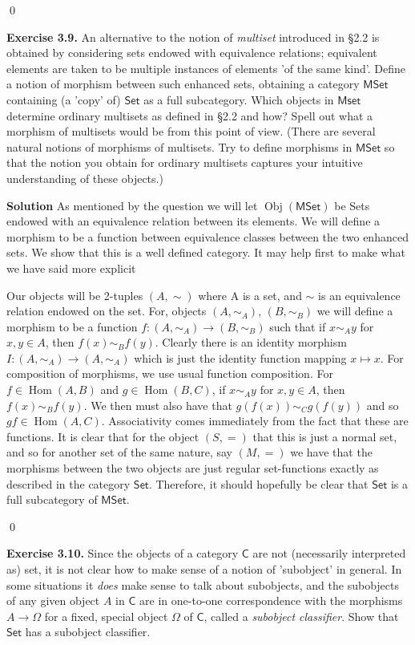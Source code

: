 \documentclass[titlepage]{article}
\newcommand{\Exercise}[1]{\textbf{Exercise #1}}
\newcommand{\Solution}{\textbf{Solution }}
\newcommand{\cat}[1]{\mathsf{#1}}
\newcommand{\Cat}{\cat{C}}
\DeclareMathOperator{\Hom}{Hom}
\DeclareMathOperator{\Obj}{Obj}
\begin{document}
\qed

\bigskip

\Exercise{3.9.} An alternative to the notion of \textit{multiset} introduced in \S 2.2 is obtained by considering sets endowed with equivalence relations; equivalent elements are taken to be multiple instances of elements 'of the same kind'. Define a notion of morphism between such enhanced sets, obtaining a category $\cat{MSet}$ containing (a 'copy' of) $\cat{Set}$ as a full subcategory. Which objects in $\cat{Mset}$ determine ordinary multisets as defined in \S 2.2 and how? Spell out what a morphism of multisets would be from this point of view. (There are several natural notions of morphisms of multisets. Try to define morphisms in $\cat{MSet}$ so that the notion you obtain for ordinary multisets captures your intuitive understanding of these objects.) 

\Solution As mentioned by the question we will let $\Obj(\cat{MSet})$ be Sets endowed with an equivalence relation between its elements. We will define a morphism to be a function between equivalence classes between the two enhanced sets. We show that this is a well defined category. It may help first to make what we have said more explicit

\smallskip

Our objects will be 2-tuples $(A,\sim)$ where A is a set, and $\sim$ is an equivalence relation endowed on the set. For, objects $(A,\sim_A)$, $(B,\sim_B)$ we will define a morphism to be a function $f:(A,\sim_A) \to (B,\sim_B)$ such that if $x \sim_A y$ for $x,y \in A$, then $f(x) \sim_B f(y)$. Clearly there is an identity morphism $I:(A,\sim_A) \to (A,\sim_A)$ which is just the identity function mapping $x \mapsto x$. For composition of morphisms, we use usual function composition. For $f \in \Hom(A,B)$ and $g \in \Hom(B,C)$, if $x \sim_A y$ for $x,y \in A$, then $f(x) \sim_B f(y)$. We then must also have that $g(f(x)) \sim_C g(f(y))$ and so $gf \in \Hom(A,C)$. Associativity comes immediately from the fact that these are functions. It is clear that for the object $(S,=)$ that this is just a normal set, and so for another set of the same nature, say $(M,=)$ we have that the morphisms between the two objects are just regular set-functions exactly as described in the category $\cat{Set}$. Therefore, it should hopefully be clear that $\cat{Set}$ is a full subcategory of $\cat{MSet}$.

\qed

\bigskip

\Exercise{3.10.} Since the objects of a category $\Cat$ are not (necessarily interpreted as) set, it is not clear how to make sense of a notion of 'subobject' in general. In some situations it \textit{does} make sense to talk about subobjects, and the subobjects of any given object $A$ in $\Cat$ are in one-to-one correspondence with the morphisms $A \to \Omega$ for a fixed, special object $\Omega$ of $\Cat$, called a \textit{subobject classifier}. Show that $\cat{Set}$ has a subobject classifier.
\end{document}
